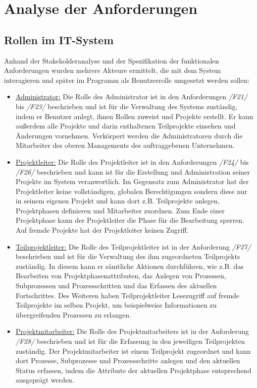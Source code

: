 \section{Analyse der Anforderungen}
\subsection{Rollen im IT-System}
Anhand der Stakeholderanalyse und der Spezifikation der funktionalen Anforderungen wurden mehrere Akteure ermittelt, die mit dem System interagieren und später im Programm als Benutzerrolle umgesetzt werden sollen:
\begin{itemize}
    \item[] \underline{Administrator:} Die Rolle des Administrator ist in den Anforderungen \emph{/F21/} bis \emph{/F23/} beschrieben und ist für die Verwaltung des Systems zuständig, indem er Benutzer anlegt, ihnen Rollen zuweist und Projekte erstellt. Er kann außerdem alle Projekte und darin enthaltenen Teilprojekte einsehen und Änderungen vornehmen. Verkörpert werden die Administratoren durch die Mitarbeiter des oberen Managements des auftraggebenen Unternehmen.
    
    \item[] \underline{Projektleiter:} Die Rolle des Projektleiter ist in den Anforderungen \emph{/F24/} bis \emph{/F26/} beschrieben und kann ist für die Erstellung und Administration seiner Projekte im System veranwortlich. Im Gegensatz zum Administrator hat der Projektleiter keine vollständigen, globalen Berechtigungen sondern diese nur in seinem eigenen Projekt und kann dort z.B. Teilprojekte anlegen, Projektphasen definieren und Mitarbeiter zuordnen. Zum Ende einer Projektphase kann der Projektleiter die Phase für die Bearbeitung sperren. Auf fremde Projekte hat der Projektleiter keinen Zugriff. 
    
    \item[] \underline{Teilprojektleiter:} Die Rolle des Teilprojektleiter ist in der Anforderung \emph{/F27/} beschrieben und ist für die Verwaltung des ihm zugeordneten Teilprojekts zuständig. In diesem kann er sämtliche Aktionen durchführen, wie z.B. das Bearbeiten von Projektphasenattributen, das Anlegen von Prozessen, Subprozessen und Prozessschritten und das Erfassen des aktuellen Fortschrittes. Des Weiteren haben Teilprojektleiter Lesezugriff auf fremde Teilprojekte im selben Projekt, um beispielweise Informationen zu übergreifenden Prozessen zu erlangen.

    \item[] \underline{Projektmitarbeiter:} Die Rolle des Projektmitarbeiters ist in der Anforderung \emph{/F28/} beschrieben und ist für die Erfassung in den jeweiligen Teilprojekten zuständig. Der Projektmitarbeiter ist einem Teilprojekt zugeordnet und kann dort Prozesse, Subprozesse und Prozessschritte anlegen und den aktuellen Status erfassen, indem die Attribute der aktuellen Projektphase entsprechend ausgeprägt werden.


\end{itemize}
